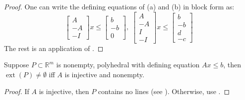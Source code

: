 \begin{proof}
	One can write the defining equations of (a) and (b) in block form as:
	\[
		\left[
			\begin{array}{r}
				A  \\\hline
				-A \\\hline
				-I
			\end{array}
			\right]
		x\leq
		\left[
			\begin{array}{r}
				b  \\\hline
				-b \\\hline
				0
			\end{array}
			\right],\;
		\left[
			\begin{array}{r}
				A  \\\hline
				-A \\\hline
				I  \\\hline
				-I
			\end{array}
			\right]
		x\leq
		\left[
			\begin{array}{r}
				b  \\\hline
				-b \\\hline
				d  \\\hline
				-c
			\end{array}
			\right]
	\]
	The rest is an application of .
\end{proof}

\begin{coro}\label{coro:017-extreme-existence-poly}
	Suppose $P\subset \mathbb{R}^m$ is nonempty, polyhedral with defining equation $Ax\leq b$, then $\operatorname{ext}(P)\neq\emptyset$ iff $A$ is injective and nonempty.
\end{coro}
\begin{proof}
	If $A$ is injective, then $P$ contains no lines (see ). Otherwise, use .
\end{proof}


